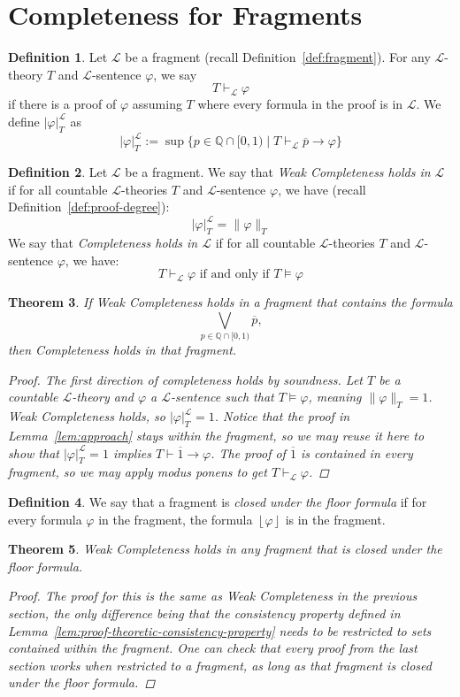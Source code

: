 \documentclass{amsart}
\newtheorem{theorem}{Theorem}[section]
\theoremstyle{definition}
\newtheorem{definition}[theorem]{Definition}
\numberwithin{equation}{theorem}
\renewcommand{\phi}{\varphi}
\newcommand{\Q}{\mathbb{Q}}
\newcommand{\where}{\mid}
\newcommand{\proves}{\vdash}
\newcommand{\strict}[1]{{\left\lfloor#1\right\rfloor}}
\newcommand{\rat}[1]{{\overline{#1}}}
\newcommand{\narrow}[1]{\xrightarrow{#1}}
\renewcommand{\to}{\narrow{}}
\newcommand{\frag}{\mathcal{L}}
\begin{document}
\section{Completeness for Fragments}
\begin{definition}
  Let $\frag$ be a fragment (recall Definition~\ref{def:fragment}).
  For any $\frag$-theory $T$ and $\frag$-sentence $\phi$, we say
  \[
    T\proves_\frag\phi
  \]
  if there is a proof of $\phi$ assuming $T$ where every formula in the proof is in $\frag$.
  We define $|\phi|_T^\frag$ as
  \[
    |\phi|_T^\frag:=\sup\{p\in\Q\cap[0,1)\where T\proves_\frag \rat p\to\phi\}
  \]
\end{definition}
\begin{definition}
  Let $\frag$ be a fragment.
  We say that \emph{Weak Completeness holds in $\frag$} if for all countable $\frag$-theories $T$ and $\frag$-sentence $\phi$, we have (recall Definition~\ref{def:proof-degree}):
  \[
    |\phi|_T^\frag=\|\phi\|_T
  \]
  We say that \emph{Completeness holds in $\frag$} if for all countable $\frag$-theories $T$ and $\frag$-sentence $\phi$, we have:
  \[
    T\proves_\frag\phi\text{ if and only if }T\models\phi
  \]
\end{definition}
\begin{theorem}
  If Weak Completeness holds in a fragment that contains the formula 
  \[
    \bigvee_{p\in\Q\cap[0,1)}\rat p,
  \]
  then Completeness holds in that fragment.
  \begin{proof}
    The first direction of completeness holds by soundness.
    Let $T$ be a countable $\frag$-theory and $\phi$ a $\frag$-sentence such that $T\models\phi$, meaning $\|\phi\|_T=1$.
    Weak Completeness holds, so $|\phi|_T^\frag=1$.
    Notice that the proof in Lemma~\ref{lem:approach} stays within the fragment, so we may reuse it here to show that $|\phi|_T^\frag=1$ implies $T\proves\rat 1\to\phi$.
    The proof of $\rat 1$ is contained in every fragment, so we may apply modus ponens to get $T\proves_\frag\phi$.
  \end{proof}
\end{theorem}
\begin{definition}
  We say that a fragment is \emph{closed under the floor formula} if for every formula $\phi$ in the fragment, the formula $\strict{\phi}$ is in the fragment.
\end{definition}

\begin{theorem}
  Weak Completeness holds in any fragment that is closed under the floor formula.
  \begin{proof}
    The proof for this is the same as Weak Completeness in the previous section, the only difference being that the consistency property defined in Lemma~\ref{lem:proof-theoretic-consistency-property} needs to be restricted to sets contained within the fragment.
    One can check that every proof from the last section works when restricted to a fragment, as long as that fragment is closed under the floor formula.
  \end{proof}
\end{theorem}
\end{document}
